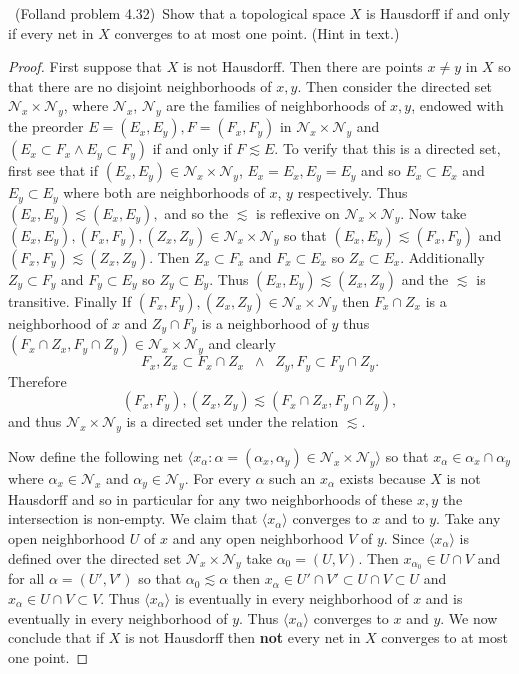 \documentclass[11pt]{amsart}
\theoremstyle{definition}
\numberwithin{theorem}{section}
\numberwithin{definition}{section}
\numberwithin{equation}{section}
\newcommand{\abr}[1]{ \langle  #1 \rangle}
\def\scriptn{{\mathcal N}}
\begin{document}
\medskip {}\ (Folland problem 4.32)\ 
Show that a topological space $X$ is Hausdorff if and only
if every net in $X$ converges to at most one point.
(Hint in text.)
\begin{proof}
	First suppose that $X$ is not Hausdorff. Then there are points $x\neq y$ in $X$ so that there are no disjoint neighborhoods of $x, y$. Then consider the directed set $\scriptn_x \times \scriptn_y$, where $\scriptn_x$, $\scriptn_y$ are the families of neighborhoods of $x,y$, endowed with the preorder $E = (E_x, E_y),F = (F_x, F_y)$ in $\scriptn_x \times \scriptn_y$ and $(E_x \subset F_x \wedge E_y \subset F_y)$ if and only if $F \lesssim E$. To verify that this is a directed set, first see that if $(E_x, E_y) \in \scriptn_x \times \scriptn_y$, $E_x = E_x, E_y = E_y$ and so $E_x \subset E_x$ and $E_y \subset E_y$ where both are neighborhoods of $x$, $y$ respectively. Thus $(E_x, E_y) \lesssim (E_x, E_y),$ and so the $\lesssim$ is reflexive on $\scriptn_x \times \scriptn_y$. Now take $(E_x, E_y), (F_x, F_y), (Z_x, Z_y) \in \scriptn_x \times \scriptn_y$ so that $(E_x, E_y) \lesssim (F_x, F_y)$ and $(F_x, F_y) \lesssim (Z_x, Z_y)$. Then $Z_x \subset F_x$ and $F_x \subset E_x$ so
	$Z_x \subset E_x$. Additionally $Z_y \subset F_y$ and $F_y \subset E_y$ so $Z_y \subset E_y$. Thus $(E_x, E_y) \lesssim (Z_x, Z_y)$ and the $\lesssim$ is transitive. Finally If $(F_x, F_y), (Z_x, Z_y) \in \scriptn_x \times \scriptn_y$ then
	$F_x \cap Z_x$ is a neighborhood of $x$ and $Z_y \cap F_y$ is a neighborhood of $y$ thus $(F_x \cap Z_x,F_y \cap Z_y) \in \scriptn_x \times \scriptn_y$ and clearly $$F_x, Z_x \subset F_x \cap Z_x\;\;\wedge\;\; Z_y, F_y \subset F_y \cap Z_y.$$
	Therefore 
	$$(F_x, F_y), (Z_x, Z_y)\lesssim (F_x \cap Z_x,F_y \cap Z_y),$$
	and thus $\scriptn_x\times\scriptn_y$ is a directed set under the relation $\lesssim.$

	Now define the following net $\abr{x_\alpha : \alpha = (\alpha_x, \alpha_y) \in \scriptn_x \times \scriptn_y}$ so that $x_\alpha \in \alpha_x \cap \alpha_y$ where $\alpha_x \in \scriptn_x$ and $\alpha_y \in \scriptn_y$. For every $\alpha$ such an $x_\alpha$ exists because $X$ is not Hausdorff and so in particular for any two neighborhoods of these $x,y$ the intersection is non-empty. We claim that $\abr{x_\alpha}$ converges to $x$ and to $y$. Take any open neighborhood $U$ of $x$ and any open neighborhood $V$ of $y$. Since $\abr{x_\alpha}$ is defined over the directed set $\scriptn_x \times \scriptn_y$ take $\alpha_0 = (U, V)$. Then $x_{\alpha_0} \in U \cap V$ and for all $\alpha = (U', V')$ so that $\alpha_0 \lesssim \alpha $ then $x_\alpha \in U' \cap V' \subset U \cap V \subset U$ and $x_\alpha \in U \cap V \subset V$. Thus $\abr{x_\alpha}$ is eventually in every neighborhood of $x$ and is eventually in every neighborhood of $y$. Thus $\abr{x_\alpha}$ converges to $x$ and $y$. We now conclude that if $X$ is not Hausdorff then \textbf{not} every net in $X$ converges to at most one point.


\end{proof}
\end{document}
